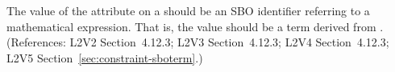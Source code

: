 The value of the  attribute on a \Constraint should be an SBO
identifier referring to a mathematical expression.  That is, the value should
be a term derived from \sbomathformula.  (References: L2V2 Section~4.12.3;
L2V3 Section~4.12.3; L2V4 Section~4.12.3; L2V5 Section~\ref{sec:constraint-sboterm}.)
